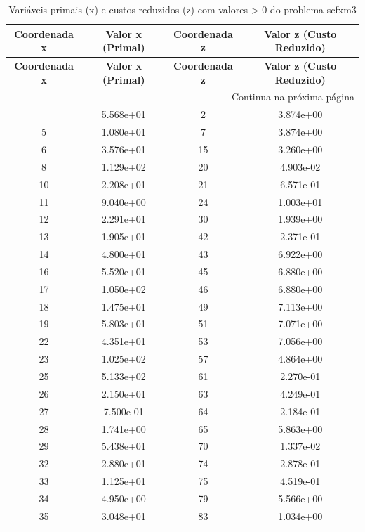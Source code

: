 \documentclass[12pt]{article}
\begin{document}
\begin{longtable}{@{}cccc@{}}
\caption{Variáveis primais (x) e custos reduzidos (z) com valores > 0 do problema scfxm3} \\
\toprule
\textbf{Coordenada x} & \textbf{Valor x (Primal)} & \textbf{Coordenada z} & \textbf{Valor z (Custo Reduzido)} \\
\midrule
\endfirsthead

\toprule
\textbf{Coordenada x} & \textbf{Valor x (Primal)} & \textbf{Coordenada z} & \textbf{Valor z (Custo Reduzido)} \\
\midrule
\endhead

\midrule \multicolumn{4}{r}{{Continua na próxima página}} \\ \midrule
\endfoot

\bottomrule
\endlastfoot
3 & 5.568e+01 & 2 & 3.874e+00 \\
5 & 1.080e+01 & 7 & 3.874e+00 \\
6 & 3.576e+01 & 15 & 3.260e+00 \\
8 & 1.129e+02 & 20 & 4.903e-02 \\
10 & 2.208e+01 & 21 & 6.571e-01 \\
11 & 9.040e+00 & 24 & 1.003e+01 \\
12 & 2.291e+01 & 30 & 1.939e+00 \\
13 & 1.905e+01 & 42 & 2.371e-01 \\
14 & 4.800e+01 & 43 & 6.922e+00 \\
16 & 5.520e+01 & 45 & 6.880e+00 \\
17 & 1.050e+02 & 46 & 6.880e+00 \\
18 & 1.475e+01 & 49 & 7.113e+00 \\
19 & 5.803e+01 & 51 & 7.071e+00 \\
22 & 4.351e+01 & 53 & 7.056e+00 \\
23 & 1.025e+02 & 57 & 4.864e+00 \\
25 & 5.133e+02 & 61 & 2.270e-01 \\
26 & 2.150e+01 & 63 & 4.249e-01 \\
27 & 7.500e-01 & 64 & 2.184e-01 \\
28 & 1.741e+00 & 65 & 5.863e+00 \\
29 & 5.438e+01 & 70 & 1.337e-02 \\
32 & 2.880e+01 & 74 & 2.878e-01 \\
33 & 1.125e+01 & 75 & 4.519e-01 \\
34 & 4.950e+00 & 79 & 5.566e+00 \\
35 & 3.048e+01 & 83 & 1.034e+00 \\

\end{longtable}
\end{document}
